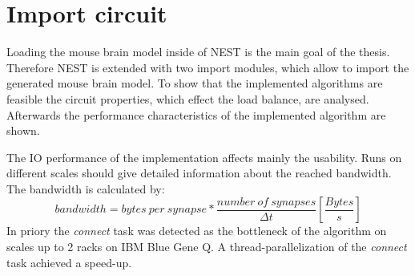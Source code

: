 \section{Import circuit}
Loading the mouse brain model inside of NEST is the main goal of the thesis.
Therefore NEST is extended with two import modules, which allow to import the
generated mouse brain model. To show that the implemented algorithms are feasible 
the circuit properties, which effect the load balance, are analysed.
Afterwards the performance characteristics of the implemented algorithm are shown.

The IO performance of the implementation affects mainly the usability.
Runs on different scales should give detailed information about the reached bandwidth.
The bandwidth is calculated by:
\begin{equation}
  bandwidth = bytes~per~synapse * \frac{number~of~synapses}{\Delta t} [\frac{Bytes}{s}]
\end{equation}
In priory the \emph{connect} task was detected as the bottleneck of the algorithm on scales up to 2 racks on IBM Blue Gene Q.
A thread-parallelization of the \emph{connect} task achieved a speed-up.

